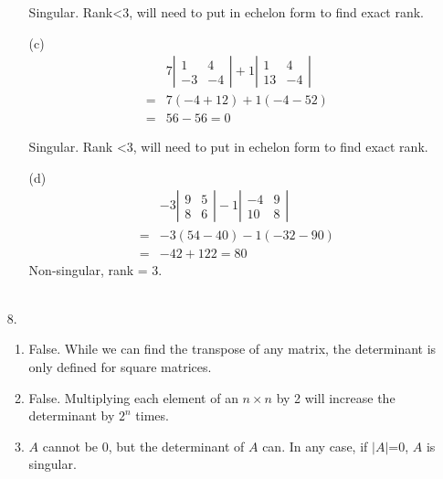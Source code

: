 \documentclass{./../../Latex/homework}
\begin{document}
\begin{enumerate}
\begin{enumerate}
Singular. Rank<3, will need to put in echelon form to find exact rank. \\

\item[(c)]
\[
\begin{aligned} & 7\left|\begin{array}{cc}1 & 4 \\ -3 & -4\end{array}\right|+1\left|\begin{array}{cc}1 & 4 \\ 13 & -4\end{array}\right| \\=& 7(-4+12)+1(-4-52) \\=& 56-56=0 \end{aligned}
\]

Singular. Rank <3, will need to put in echelon form to find exact rank. \\

\item[(d)]
$$ \begin{aligned} &-3\left|\begin{array}{ll}9 & 5 \\ 8 & 6\end{array}\right|-1\left|\begin{array}{cc}-4 & 9 \\ 10 & 8\end{array}\right| \\
 =&-3(54-40)-1(-32-90) \\
 =&-42+122=80 \end{aligned}$$
Non-singular, rank = 3. \\~\\
\end{enumerate}

\item[8.] 
\begin{enumerate}
\item False. While we can find the transpose of any matrix, the determinant is only defined for square matrices. 
\item False. Multiplying each element of an $n \times n$ by 2 will increase the determinant by $2^n$ times. 
\item $A$ cannot be 0, but the determinant of $A$ can. In any case, if $|A|$=0, $A$ is singular.
\end{enumerate}

\end{enumerate}
\end{document}
